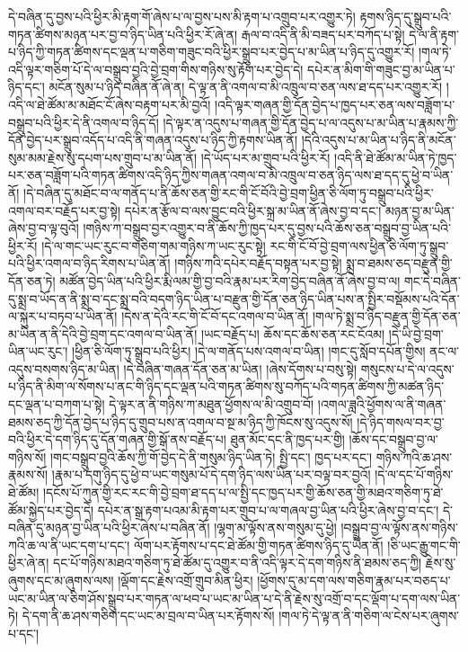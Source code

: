 དེ་བཞིན་དུ་བྱས་པའི་ཕྱིར་མི་རྟག་གོ་ཞེས་པ་ལ་བྱས་པས་མི་རྟག་པ་འགྲུབ་པར་འགྱུར་ཏེ། རྟགས་ཉིད་དུ་སྒྲུབ་པའི་གཏན་ཚིགས་མཉན་པར་བྱ་བ་ཉིད་ཡིན་པའི་ཕྱིར་རོ་ཞེ་ན། རྒལ་བ་འདི་ནི་མི་བཟད་པར་བཀོད་པ་སྟེ། དེ་ལ་ནི་རྟག་པ་ཉིད་ཀྱི་གཏན་ཚིགས་དང་ལྡན་པ་གཅིག་གཟུང་བའི་ཕྱིར་སྒྲུབ་པར་བྱེད་པ་མ་ཡིན་པ་ཉིད་དུ་འགྱུར་རོ། །གལ་ཏེ་འདི་ལྟར་གཅིག་པོ་དེ་ལ་བསྒྲུབ་བྱའི་བྱེ་བྲག་གིས་གཉིས་སུ་རྟོག་པར་བྱེད་དེ། དཔེར་ན་མིག་གི་གཟུང་བྱ་མ་ཡིན་པ་ཉིད་དང་། མངོན་སུམ་པ་ཉིད་བཞིན་ནོ་ཞེ་ན། དེ་ལྟ་ན་ནི་འགལ་བ་མི་འཁྲུལ་བ་ཅན་ལས་ཐ་དད་པར་འགྱུར་རོ། །འདི་ལ་ཐེ་ཚོམ་མ་མཐོང་ངོ་ཞེས་བརྟག་པར་མི་བྱའོ། །འདི་ལྟར་གཞན་གྱི་དོན་བྱེད་པ་ཁྱད་པར་ཅན་ལས་བཟློག་པ་བསྒྲུབ་པའི་ཕྱིར་དེ་ནི་འགལ་བ་ཉིད་དོ། །དེ་ལྟར་ན་འདུས་པ་གཞན་གྱི་དོན་བྱེད་པ་ལ་འདུས་པ་མ་ཡིན་པ་རྣམས་ཀྱི་དོན་བྱེད་པར་སྒྲུབ་འདོད་པ་འདི་ནི་གཞན་འདུས་པ་ཉིད་ཀྱི་རྟགས་ཡིན་ནོ། །དེའི་འདུས་པ་མ་ཡིན་པ་ཉིད་ནི་མངོན་སུམ་མམ་རྗེས་སུ་དཔག་པས་གྲུབ་པ་མ་ཡིན་ནོ། །དེ་ཡོད་པར་མ་གྲུབ་པའི་ཕྱིར་རོ། །འདི་ནི་ཐེ་ཚོམ་མ་ཡིན་ཏེ་ཁྱད་པར་ཅན་བཟློག་པའི་གཏན་ཚིགས་འདི་ཉིད་ཀྱིས་གཞན་འགལ་བ་མི་འཁྲུལ་བ་ཅན་ཉིད་ལས་ཐ་དད་དུ་ཕྱེ་བ་ཡིན་ནོ། །དེ་བཞིན་དུ་མཐོང་བ་ལ་གནོད་པ་ནི་ཆོས་ཅན་གྱི་རང་གི་ངོ་བོའི་བྱེ་བྲག་ཕྱིན་ཅི་ལོག་ཏུ་བསྒྲུབ་པའི་ཕྱིར་འགལ་བར་བརྗོད་པར་བྱ་སྟེ། དཔེར་ན་རྩོལ་བ་ལས་བྱུང་བའི་ཕྱིར་སྐྲ་མ་ཡིན་ནོ་ཞེས་བྱ་བ་དང་། མཉན་བྱ་མ་ཡིན་ཞེས་བྱ་བ་ལྟ་བུའོ། །གཉིས་ཀ་བསྒྲུབ་བྱར་འགྱུར་བ་ནི་ཆོས་ཀྱི་ཁྱད་པར་དུ་བྱས་པའི་ཆོས་ཅན་བསྒྲུབ་བྱ་ཡིན་པའི་ཕྱིར་རོ། །དེ་ལ་གང་ཡང་རུང་བ་གཅིག་གམ་གཉིས་ཀ་ཡང་རུང་སྟེ། རང་གི་ངོ་བོ་བྱེ་བྲག་ལས་ཕྱིན་ཅི་ལོག་ཏུ་སྒྲུབ་པའི་ཕྱིར་འགལ་བ་ཉིད་རིགས་པ་ཡིན་ནོ། །གཉིས་ཀའི་དཔེར་བརྗོད་བསྟན་པར་བྱ་སྟེ། སྨྲ་བ་ཐམས་ཅད་བརྫུན་གྱི་དོན་ཅན་ཏེ། མཚོན་བྱེད་ཡིན་པའི་ཕྱིར་རྨི་ལམ་གྱི་བྱ་བའི་རྣམ་པར་རིག་བྱེད་བཞིན་ནོ་ཞེས་བྱ་བ་ལ། གང་དེ་བཞིན་དུ་སྨྲ་བ་ཡོད་ན་ནི་སྨྲ་བ་དང་སྨྲ་བའི་བདག་ཉིད་ཡིན་པ་བརྫུན་གྱི་དོན་ཅན་ཉིད་ཡིན་པས་ན་སྤྱིར་བསྡོམས་པའི་དོན་ལ་སྐུར་པ་བཏབ་པ་ཡིན་ནོ། །དེས་ན་དེའི་རང་གི་ངོ་བོ་དང་འགལ་བ་ཡིན་ནོ། །གལ་ཏེ་སྨྲ་བ་ཉིད་བརྫུན་གྱི་དོན་ཅན་མ་ཡིན་ན་ནི་དེའི་བྱེ་བྲག་དང་འགལ་བ་ཡིན་ནོ། །ཡང་བརྗོད་པ། ཆོས་དང་ཆོས་ཅན་རང་ངོའམ། །དེ་ཡི་བྱེ་བྲག་ཡིན་ཡང་རུང་། །ཕྱིན་ཅི་ལོག་ཏུ་སྒྲུབ་པའི་ཕྱིར། །དེ་ལ་གནོད་པས་འགལ་བ་ཡིན། །གང་དུ་སློབ་དཔོན་གྱིས། ནང་ལ་འདུས་བསགས་ཉིད་མ་ཡིན། །དེ་བཞིན་གཞན་དོན་ཅན་མ་ཡིན། །ཞེས་དོགས་པ་བསུ་སྟེ། གསུངས་པ་དེ་ལ་འདུས་པ་ཉིད་ནི་མིག་ལ་སོགས་པ་ནང་གི་ཉིད་དང་ལྡན་པའི་གཏན་ཚིགས་སུ་བཀོད་པའི་གཏན་ཚིགས་ཀྱི་མཚན་ཉིད་དང་ལྡན་པ་བཀག་པ་སྟེ། དེ་ལྟར་ན་ནི་གཉིས་ཀ་མཐུན་ཕྱོགས་ལ་མི་འགྲུབ་བོ། །འགལ་ཟླའི་ཕྱོགས་ལ་ནི་གཞན་ཐམས་ཅད་ཀྱི་དོན་བྱེད་པ་ཉིད་དུ་གྲུབ་པས་ན་འགལ་བ་སྔ་མ་ཉིད་ཀྱི་ཁོངས་སུ་འདུས་སོ། །དེ་ཉིད་གསལ་བར་བྱ་བའི་ཕྱིར་དེ་དག་ཉིད་དུ་དོན་གཞན་གྱི་སྒོ་ནས་བརྗོད་པ། ཐུན་མོང་དང་ནི་ཁྱད་པར་གྱི། །ཆོས་དང་བསྒྲུབ་བྱ་ལ་གཉིས་སོ། །གང་བསྒྲུབ་བྱའི་ཆོས་ཀྱི་གོ་བྱེད་དེ་ནི་གསུམ་ཉིད་ཡིན་ཏེ། སྤྱི་དང་། ཁྱད་པར་དང་། གཉིས་ཀའི་ཆ་ཤས་རྣམས་སོ། །རྣམ་པ་དགུ་ཉིད་དུ་ཕྱེ་བ་ཡང་གསུམ་པོ་དེ་དག་ཉིད་ལས་ཡིན་པར་བལྟ་བར་བྱའོ། །དེ་ལ་དང་པོ་གཉིས་ཐེ་ཚོམ། །དངོས་པོ་ཀུན་གྱི་རང་རང་གི་བྱེ་བྲག་ཐ་དད་པ་ལ་སྤྱི་དང་ཁྱད་པར་གྱི་ཆོས་ཅན་གྱི་མཐའ་གཅིག་ཏུ་ཐེ་ཚོམ་སྐྱེད་པར་བྱེད་དེ། དཔེར་ན་སྒྲ་རྟག་པའམ་མི་རྟག་པར་གྲུབ་པ་ལ་གཞལ་བྱ་ཡིན་པའི་ཕྱིར་ཞེས་བྱ་བ་དང་། དེ་བཞིན་དུ་མཉན་བྱ་ཡིན་པའི་ཕྱིར་ཞེས་པ་བཞིན་ནོ། །ལྷག་མ་ལྟོས་ནས་གསུམ་དུ་ཕྱེ། །བསྒྲུབ་བྱ་ལ་ལྟོས་ནས་གཉིས་ཀའི་ཆ་ལ་ནི་ཡང་དག་པ་དང་། ལོག་པར་རྟོགས་པ་དང་ཐེ་ཚོམ་གྱི་གཏན་ཚིགས་ཉིད་དུ་ཡིན་ནོ། །ཅི་ཡང་རྒྱུ་གང་གི་ཕྱིར་ཞེ་ན། དང་པོ་གཉིས་མཐའ་གཅིག་ཏུ་ཐེ་ཚོམ་དུ་འགྱུར་བ་ནི་འདི་ལྟར་དེ་དག་གཉིས་ནི་ཐམས་ཅད་ཀྱི། རྗེས་སུ་ཞུགས་དང་མ་ཞུགས་ལས། །ལྡོག་དང་རྗེས་འགྲོ་གྲུབ་མིན་ཕྱིར། །ཕྱོགས་དུ་མ་དག་ལས་གཅིག་རྣམ་པར་བཅད་པ་ཡང་མ་ཡིན་ལ་ཅིག་ཤོས་སྒྲུབ་པར་གཏན་ལ་ཕབ་པ་ཡང་མ་ཡིན་པ་དེ་ནི་རྗེས་སུ་འགྲོ་བ་དང་ལྡོག་པ་དག་ལས་ཡིན་ཏེ། དེ་དག་ནི་ཆ་ཤས་གཅིག་དང་ཡང་མ་བྲལ་བ་ཡིན་པར་རྟོགས་སོ། །གལ་ཏེ་དེ་ལྟ་ན་ནི་གཅིག་ལ་ངེས་པར་ཞུགས་པ་དང་། 